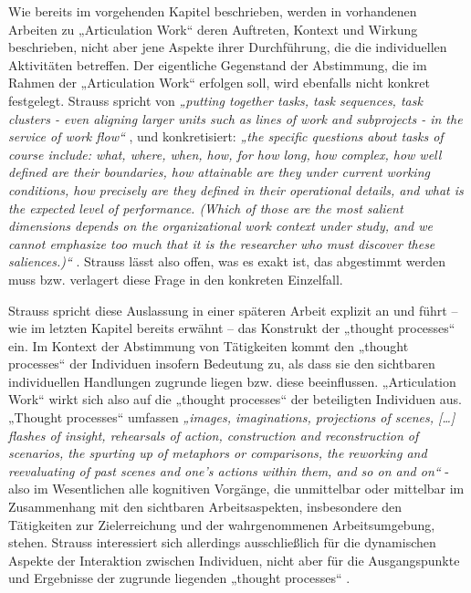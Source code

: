 Wie bereits im vorgehenden Kapitel beschrieben, werden in vorhandenen Arbeiten zu „Articulation Work“ deren Auftreten, Kontext und Wirkung beschrieben, nicht aber jene Aspekte ihrer Durchführung, die die individuellen Aktivitäten betreffen. Der eigentliche Gegenstand der Abstimmung, die im Rahmen der „Articulation Work“ erfolgen soll, wird ebenfalls nicht konkret festgelegt. Strauss spricht von \emph{„putting together tasks, task sequences, task clusters - even aligning larger units such as lines of work and subprojects - in the service of work flow“} \citep[][S. 2]{Strauss88}, und konkretisiert: \emph{„the specific questions about tasks of course include: what, where, when, how, for how long, how complex, how well defined are their boundaries, how attainable are they under current working conditions, how precisely are they defined in their operational details, and what is the expected level of performance. (Which of those are the most salient dimensions depends on the organizational work context under study, and we cannot emphasize too much that it is the researcher who must discover these saliences.)“} \citep[][S. 6]{Strauss85}. Strauss lässt also offen, was es exakt ist, das abgestimmt werden muss bzw. verlagert diese Frage in den konkreten Einzelfall. 

Strauss spricht diese Auslassung in einer späteren Arbeit explizit an \citep[][S. 131]{Strauss93} und führt -- wie im letzten Kapitel bereits erwähnt -- das Konstrukt der „thought processes“ ein. Im Kontext der Abstimmung von Tätigkeiten kommt den „thought processes“ der Individuen insofern Bedeutung zu, als dass sie den sichtbaren individuellen Handlungen zugrunde liegen bzw. diese beeinflussen. „Articulation Work“ wirkt sich also auf die „thought processes“ der beteiligten Individuen aus. „Thought processes“ umfassen \emph{„images, imaginations, projections of scenes, [\ldots] flashes of insight, rehearsals of action, construction and reconstruction of scenarios,  the spurting up of metaphors or comparisons, the reworking and reevaluating of past scenes and one's actions within them, and so on and on“} \citep[][S. 130]{Strauss93} - also im Wesentlichen alle kognitiven Vorgänge, die unmittelbar oder mittelbar im Zusammenhang mit den sichtbaren Arbeitsaspekten, insbesondere den Tätigkeiten zur Zielerreichung und der wahrgenommenen Arbeitsumgebung, stehen. Strauss interessiert sich allerdings ausschließlich für die dynamischen Aspekte der Interaktion zwischen Individuen, nicht aber für die Ausgangspunkte und Ergebnisse der zugrunde liegenden „thought processes“ \citep[][S. 149]{Strauss93}.

